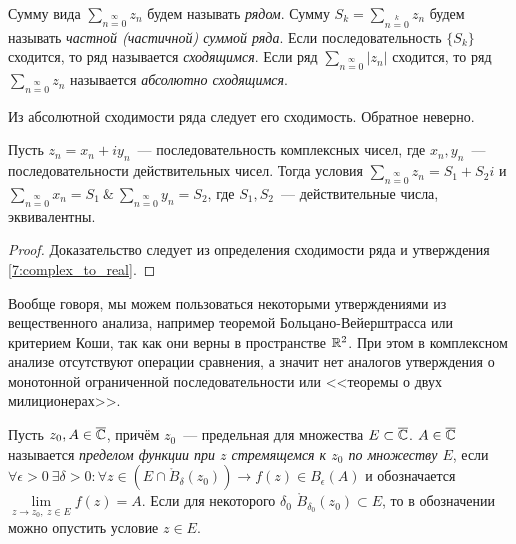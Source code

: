 \begin{definition}
Сумму вида \(\sum\limits_{n=0}\limits^{\infty} z_n\) будем называть \textit{рядом}. Сумму \(S_k =
\sum\limits_{n=0}\limits^{k} z_n\) будем называть \textit{частной (частичной) суммой ряда}. Если
последовательность \(\{S_k\}\) сходится, то ряд называется \textit{сходящимся}. Если ряд
\(\sum\limits_{n=0}\limits^{\infty} |z_n|\) сходится, то ряд \(\sum\limits_{n=0}\limits^{\infty}
z_n\) называется \textit{абсолютно сходящимся}.
\end{definition}

\begin{note}
Из абсолютной сходимости ряда следует его сходимость. Обратное неверно.
\end{note}

\begin{statement}
Пусть \(z_n = x_n + iy_n\)~--- последовательность комплексных чисел, где \(x_n, y_n\)~---
последовательности действительных чисел. Тогда условия \(\sum\limits_{n=0}\limits^{\infty} z_n = S_1
+ S_2i\) и \(\sum\limits_{n=0}\limits^{\infty} x_n = S_1 \ \& \ \sum\limits_{n=0}\limits^{\infty}
y_n = S_2\), где \(S_1, S_2\)~--- действительные числа, эквивалентны.
\end{statement}

\begin{proof}
Доказательство следует из определения сходимости ряда и утверждения \ref{7:complex_to_real}.
\end{proof}

Вообще говоря, мы можем пользоваться некоторыми утверждениями из вещественного анализа, например
теоремой Больцано-Вейерштрасса или критерием Коши, так как они верны в пространстве \(\mathbb{R}^2\). При
этом в комплексном анализе отсутствуют операции сравнения, а значит нет аналогов утверждения о
монотонной ограниченной последовательности или <<теоремы о двух милиционерах>>.



\begin{definition}
Пусть \(z_0, A \in \overline{\mathbb{C}}\), причём \(z_0\)~--- предельная для множества \(E \subset \overline{\mathbb{C}}\). \(A \in
\overline{\mathbb{C}}\) называется \textit{пределом функции при \(z\) стремящемся к \(z_0\) по множеству \(E\)}, если
\(\forall \epsilon > 0 \ \exists \delta > 0 \colon \forall z \in (E \cap \mathring{B}_\delta (z_0))
\rightarrow f(z) \in B_\epsilon(A)\) и обозначается \(\lim\limits_{z \to z_0, \ z \in E} f(z) = A\).
Если для некоторого \(\delta_0\) \(\mathring{B}_{\delta_0} (z_0) \subset E\), то в обозначении можно
опустить условие \(z \in E\).
\end{definition}

